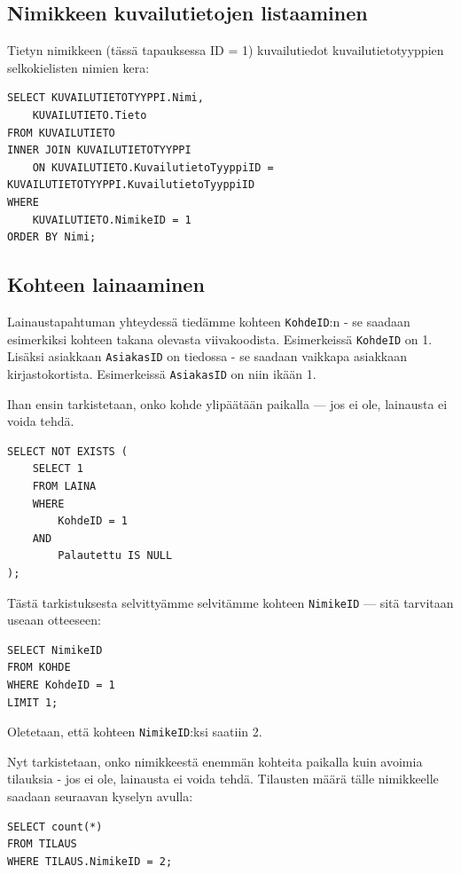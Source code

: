\documentclass{article}
\begin{document}
\subsection{Nimikkeen kuvailutietojen listaaminen}

Tietyn nimikkeen (tässä tapauksessa ID = 1) kuvailutiedot kuvailutietotyyppien selkokielisten nimien kera:

\begin{lstlisting}
SELECT KUVAILUTIETOTYYPPI.Nimi,
    KUVAILUTIETO.Tieto 
FROM KUVAILUTIETO
INNER JOIN KUVAILUTIETOTYYPPI
    ON KUVAILUTIETO.KuvailutietoTyyppiID = KUVAILUTIETOTYYPPI.KuvailutietoTyyppiID
WHERE
    KUVAILUTIETO.NimikeID = 1
ORDER BY Nimi;
\end{lstlisting}

\subsection{Kohteen lainaaminen}

Lainaustapahtuman yhteydessä tiedämme kohteen \texttt{KohdeID}:n - se saadaan esimerkiksi kohteen takana olevasta viivakoodista. Esimerkeissä \texttt{KohdeID} on 1. Lisäksi asiakkaan \texttt{AsiakasID} on tiedossa - se saadaan vaikkapa asiakkaan kirjastokortista. Esimerkeissä \texttt{AsiakasID} on niin ikään 1.

Ihan ensin tarkistetaan, onko kohde ylipäätään paikalla --- jos ei ole, lainausta ei voida tehdä.

\begin{lstlisting}
SELECT NOT EXISTS (
    SELECT 1
    FROM LAINA
    WHERE
        KohdeID = 1
    AND
        Palautettu IS NULL
);
\end{lstlisting}

Tästä tarkistuksesta selvittyämme selvitämme kohteen \texttt{NimikeID} --- sitä tarvitaan useaan otteeseen:

\begin{lstlisting}
SELECT NimikeID
FROM KOHDE
WHERE KohdeID = 1
LIMIT 1;
\end{lstlisting}

Oletetaan, että kohteen \texttt{NimikeID}:ksi saatiin 2.

Nyt tarkistetaan, onko nimikkeestä enemmän kohteita paikalla kuin avoimia tilauksia - jos ei ole, lainausta ei voida tehdä. Tilausten määrä tälle nimikkeelle saadaan seuraavan kyselyn avulla:

\begin{lstlisting}
SELECT count(*)
FROM TILAUS
WHERE TILAUS.NimikeID = 2;
\end{lstlisting}
\end{document}
